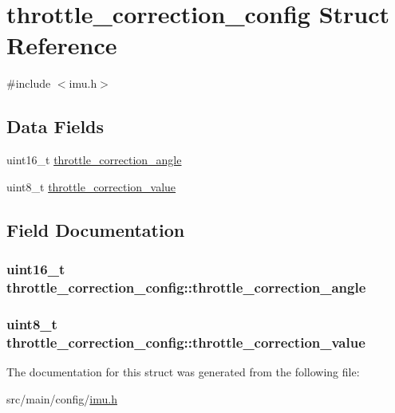 \hypertarget{structthrottle__correction__config}{\section{throttle\+\_\+correction\+\_\+config Struct Reference}
\label{structthrottle__correction__config}
}


{\ttfamily \#include $<$imu.\+h$>$}

\subsection*{Data Fields}
\begin{DoxyCompactItemize}
\item 
uint16\+\_\+t \hyperlink{structthrottle__correction__config_a907eb0939774691bc430bf9c506f73e4}{throttle\+\_\+correction\+\_\+angle}
\item 
uint8\+\_\+t \hyperlink{structthrottle__correction__config_af433eb622156298cef88542d372b51cd}{throttle\+\_\+correction\+\_\+value}
\end{DoxyCompactItemize}


\subsection{Field Documentation}
\hypertarget{structthrottle__correction__config_a907eb0939774691bc430bf9c506f73e4}{
\subsubsection[{throttle\+\_\+correction\+\_\+angle}]{\setlength{\rightskip}{0pt plus 5cm}uint16\+\_\+t throttle\+\_\+correction\+\_\+config\+::throttle\+\_\+correction\+\_\+angle}}\label{structthrottle__correction__config_a907eb0939774691bc430bf9c506f73e4}
\hypertarget{structthrottle__correction__config_af433eb622156298cef88542d372b51cd}{
\subsubsection[{throttle\+\_\+correction\+\_\+value}]{\setlength{\rightskip}{0pt plus 5cm}uint8\+\_\+t throttle\+\_\+correction\+\_\+config\+::throttle\+\_\+correction\+\_\+value}}\label{structthrottle__correction__config_af433eb622156298cef88542d372b51cd}


The documentation for this struct was generated from the following file\+:\begin{DoxyCompactItemize}
\item 
src/main/config/\hyperlink{config_2imu_8h}{imu.\+h}\end{DoxyCompactItemize}
